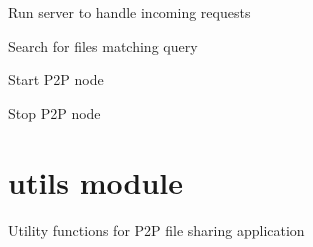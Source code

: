 \documentclass[letterpaper,10pt,english]{sphinxmanual}
\begin{document}
\begin{fulllineitems}
\begin{fulllineitems}
\label{\detokenize{node:node.P2PNode.run_server}}
\pysigstartsignatures
\pysiglinewithargsret
{}
{}
{}
\pysigstopsignatures
\sphinxAtStartPar
Run server to handle incoming requests

\end{fulllineitems}


\begin{fulllineitems}
\label{\detokenize{node:node.P2PNode.search_files}}
\pysigstartsignatures
\pysiglinewithargsret
{}
{}
{}
\pysigstopsignatures
\sphinxAtStartPar
Search for files matching query

\end{fulllineitems}


\begin{fulllineitems}
\label{\detokenize{node:node.P2PNode.start}}
\pysigstartsignatures
\pysiglinewithargsret
{}
{}
{}
\pysigstopsignatures
\sphinxAtStartPar
Start P2P node

\end{fulllineitems}


\begin{fulllineitems}
\label{\detokenize{node:node.P2PNode.stop}}
\pysigstartsignatures
\pysiglinewithargsret
{}
{}
{}
\pysigstopsignatures
\sphinxAtStartPar
Stop P2P node

\end{fulllineitems}


\end{fulllineitems}


\sphinxstepscope


\section{utils module}
\label{\detokenize{utils:module-utils}}\label{\detokenize{utils:utils-module}}\label{\detokenize{utils::doc}}
\sphinxAtStartPar
Utility functions for P2P file sharing application
\end{document}
